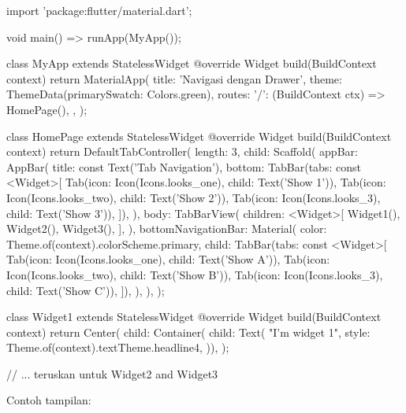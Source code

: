 \documentclass[a4paper,11pt]{article} %
\begin{document}
\begin{dartcode}
import 'package:flutter/material.dart';

void main() => runApp(MyApp());
  
class MyApp extends StatelessWidget {
  @override
  Widget build(BuildContext context) {
    return MaterialApp(
      title: 'Navigasi dengan Drawer',
      theme: ThemeData(primarySwatch: Colors.green),
      routes: {
        '/': (BuildContext ctx) => HomePage(),
      },
    );
  }
}
  
class HomePage extends StatelessWidget {
  @override
  Widget build(BuildContext context) {
    return DefaultTabController(
      length: 3,
      child: Scaffold(
        appBar: AppBar(
          title: const Text('Tab Navigation'),
          bottom: TabBar(tabs: const <Widget>[
            Tab(icon: Icon(Icons.looks_one), child: Text('Show 1')),
            Tab(icon: Icon(Icons.looks_two), child: Text('Show 2')),
            Tab(icon: Icon(Icons.looks_3), child: Text('Show 3')),
          ]),
        ),
        body: TabBarView(
          children: <Widget>[
            Widget1(),
            Widget2(),
            Widget3(),
          ],
        ),
        bottomNavigationBar: Material(
          color: Theme.of(context).colorScheme.primary,
          child: TabBar(tabs: const <Widget>[
            Tab(icon: Icon(Icons.looks_one), child: Text('Show A')),
            Tab(icon: Icon(Icons.looks_two), child: Text('Show B')),
            Tab(icon: Icon(Icons.looks_3), child: Text('Show C')),
          ]),
        ),
      ),
    );
  }
}

class Widget1 extends StatelessWidget {
  @override
  Widget build(BuildContext context) {
    return Center(
      child: Container(
          child:  Text(
        "I'm widget 1",
        style: Theme.of(context).textTheme.headline4,
      )),
    );
  }
}

// ... teruskan untuk Widget2 and Widget3
\end{dartcode}

Contoh tampilan:
\end{document}
